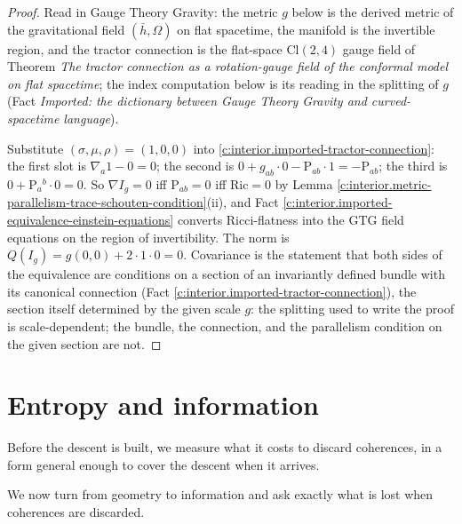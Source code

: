 \documentclass[11pt]{article}
\theoremstyle{definition}
\theoremstyle{plain}
\providecommand{\Cl}{}\renewcommand{\Cl}{\mathrm{Cl}}
\providecommand{\Ric}{}\renewcommand{\Ric}{\mathrm{Ric}}
\providecommand{\Sch}{}\renewcommand{\Sch}{\mathrm{P}}
\providecommand{\hb}{}\renewcommand{\hb}{\bar{h}}
\begin{document}
\begin{proof}
Read in Gauge Theory Gravity: the metric $g$ below is the derived metric of the gravitational field $(\hb, \Omega)$ on flat spacetime, the manifold is the invertible region, and the tractor connection is the flat-space $\Cl(2,4)$ gauge field of Theorem \emph{The tractor connection as a rotation-gauge field of the conformal model on flat spacetime}; the index computation below is its reading in the splitting of $g$ (Fact \emph{Imported: the dictionary between Gauge Theory Gravity and curved-spacetime language}).

Substitute $(\sigma, \mu, \rho) = (1, 0, 0)$ into \ref{c:interior.imported-tractor-connection}: the first slot is $\nabla_a 1 - 0 = 0$; the second is $0 + g_{ab}\cdot 0 - \Sch_{ab}\cdot 1 = -\Sch_{ab}$; the third is $0 + \Sch_a{}^b \cdot 0 = 0$. So $\nabla I_g = 0$ iff $\Sch_{ab} = 0$ iff $\Ric = 0$ by Lemma \ref{c:interior.metric-parallelism-trace-schouten-condition}(ii), and Fact \ref{c:interior.imported-equivalence-einstein-equations} converts Ricci-flatness into the GTG field equations on the region of invertibility. The norm is $Q(I_g) = g(0,0) + 2 \cdot 1 \cdot 0 = 0$. Covariance is the statement that both sides of the equivalence are conditions on a section of an invariantly defined bundle with its canonical connection (Fact \ref{c:interior.imported-tractor-connection}), the section itself determined by the given scale $g$: the splitting used to write the proof is scale-dependent; the bundle, the connection, and the parallelism condition on the given section are not.

\end{proof}

\section{Entropy and information}

Before the descent is built, we measure what it costs to discard coherences, in a form general enough to cover the descent when it arrives.

We now turn from geometry to information and ask exactly what is lost when coherences are discarded.
\end{document}
